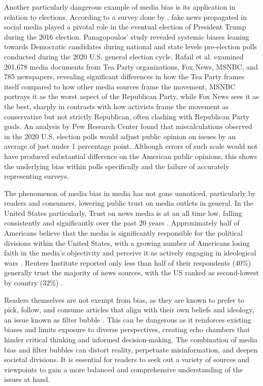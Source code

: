 Another particularly dangerous example of media bias is its application in relation to elections. According to a survey done by \cite{allcott-2017-socialmedia-2016election}, fake news propagated in social media played a pivotal role in the eventual election of President Trump during the 2016 election. Panagopoulos' study \cite{panagopoulos-2020} revealed systemic biases leaning towards Democratic candidates during national and state levels pre-election polls conducted during the 2020 U.S. general election cycle. Rafail et al. \cite{rafail-2018-tea-party} examined 201,678 media documents from Tea Party organizations, Fox News, MSNBC, and 785 newspapers, revealing significant differences in how the Tea Party frames itself compared to how other media sources frame the movement, MSNBC portrays it as the worst aspect of the Republican Party, while Fox News sees it as the best, sharply in contrasts with how activists frame the movement as conservative but not strictly Republican, often clashing with Republican Party goals. An analysis by Pew Research Center \cite{pew-2021-election2020} found that miscalculations observed in the 2020 U.S. election polls would adjust public opinion on issues by an average of just under 1 percentage point. Although errors of such scale would not have produced substantial difference on the American public opinions, this shows the underlying bias within polls specifically and the failure of accurately representing surveys.

The phenomenon of media bias in media has not gone unnoticed, particularly by readers and consumers, lowering public trust on media outlets in general. In the United States particularly, Trust on news media is at an all time low, falling consistently and significantly over the past 20 years \cite{pew-2021-partisan-divides, gallup-knight-2020-american-views, reuters-2023-digital-news-report}. Approximately half of Americans believe that the media is significantly responsible for the political divisions within the United States, with a growing number of Americans losing faith in the media's objectivity and perceive it as actively engaging in ideological wars \cite{gallup-knight-2020-american-views}. Reuters Institute reported only less than half of their respondents (40\%) generally trust the majority of news sources, with the US ranked as second-lowest by country (32\%) \cite{reuters-2023-digital-news-report}.

Readers themselves are not exempt from bias, as they are known to prefer to pick, follow, and consume articles that align with their own beliefs and ideology, an issue known as filter bubble \cite{lim-2018-understanding}. This can be dangerous as it reinforces existing biases and limits exposure to diverse perspectives, creating echo chambers that hinder critical thinking and informed decision-making. The combination of media bias and filter bubbles can distort reality, perpetuate misinformation, and deepen societal divisions. It is essential for readers to seek out a variety of sources and viewpoints to gain a more balanced and comprehensive understanding of the issues at hand.

